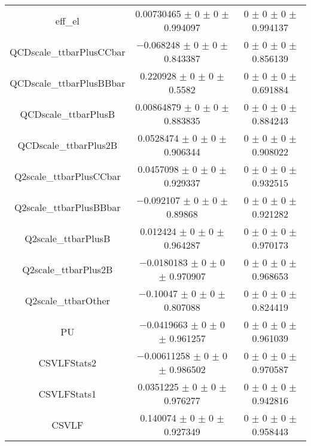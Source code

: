 \begin{table}
\begin{tabular}{ccc}
eff\_el 	& \num{0.00730465} $\pm$ \num{0} $\pm$ \num{0} $\pm$ \num{0.994097} 	& \num{0} $\pm$ \num{0} $\pm$ \num{0} $\pm$ \num{0.994137}\\
QCDscale\_ttbarPlusCCbar 	& \num{-0.068248} $\pm$ \num{0} $\pm$ \num{0} $\pm$ \num{0.843387} 	& \num{0} $\pm$ \num{0} $\pm$ \num{0} $\pm$ \num{0.856139}\\
QCDscale\_ttbarPlusBBbar 	& \num{0.220928} $\pm$ \num{0} $\pm$ \num{0} $\pm$ \num{0.5582} 	& \num{0} $\pm$ \num{0} $\pm$ \num{0} $\pm$ \num{0.691884}\\
QCDscale\_ttbarPlusB 	& \num{0.00864879} $\pm$ \num{0} $\pm$ \num{0} $\pm$ \num{0.883835} 	& \num{0} $\pm$ \num{0} $\pm$ \num{0} $\pm$ \num{0.884243}\\
QCDscale\_ttbarPlus2B 	& \num{0.0528474} $\pm$ \num{0} $\pm$ \num{0} $\pm$ \num{0.906344} 	& \num{0} $\pm$ \num{0} $\pm$ \num{0} $\pm$ \num{0.908022}\\
Q2scale\_ttbarPlusCCbar 	& \num{0.0457098} $\pm$ \num{0} $\pm$ \num{0} $\pm$ \num{0.929337} 	& \num{0} $\pm$ \num{0} $\pm$ \num{0} $\pm$ \num{0.932515}\\
Q2scale\_ttbarPlusBBbar 	& \num{-0.092107} $\pm$ \num{0} $\pm$ \num{0} $\pm$ \num{0.89868} 	& \num{0} $\pm$ \num{0} $\pm$ \num{0} $\pm$ \num{0.921282}\\
Q2scale\_ttbarPlusB 	& \num{0.012424} $\pm$ \num{0} $\pm$ \num{0} $\pm$ \num{0.964287} 	& \num{0} $\pm$ \num{0} $\pm$ \num{0} $\pm$ \num{0.970173}\\
Q2scale\_ttbarPlus2B 	& \num{-0.0180183} $\pm$ \num{0} $\pm$ \num{0} $\pm$ \num{0.970907} 	& \num{0} $\pm$ \num{0} $\pm$ \num{0} $\pm$ \num{0.968653}\\
Q2scale\_ttbarOther 	& \num{-0.10047} $\pm$ \num{0} $\pm$ \num{0} $\pm$ \num{0.807088} 	& \num{0} $\pm$ \num{0} $\pm$ \num{0} $\pm$ \num{0.824419}\\
PU 	& \num{-0.0419663} $\pm$ \num{0} $\pm$ \num{0} $\pm$ \num{0.961257} 	& \num{0} $\pm$ \num{0} $\pm$ \num{0} $\pm$ \num{0.961039}\\
CSVLFStats2 	& \num{-0.00611258} $\pm$ \num{0} $\pm$ \num{0} $\pm$ \num{0.986502} 	& \num{0} $\pm$ \num{0} $\pm$ \num{0} $\pm$ \num{0.970587}\\
CSVLFStats1 	& \num{0.0351225} $\pm$ \num{0} $\pm$ \num{0} $\pm$ \num{0.976277} 	& \num{0} $\pm$ \num{0} $\pm$ \num{0} $\pm$ \num{0.942816}\\
CSVLF 	& \num{0.140074} $\pm$ \num{0} $\pm$ \num{0} $\pm$ \num{0.927349} 	& \num{0} $\pm$ \num{0} $\pm$ \num{0} $\pm$ \num{0.958443}\\

\end{tabular}
\end{table}
